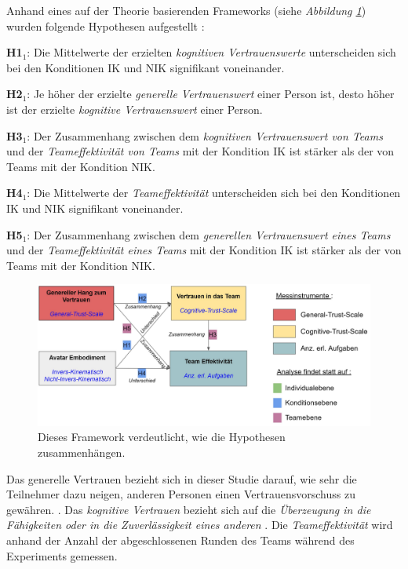\documentclass[sigchi]{acmart}
\begin{document}
Anhand eines auf der Theorie basierenden Frameworks (siehe \textit{Abbildung \ref{Versuchshypothesen}}) wurden folgende Hypothesen aufgestellt :

\textbf{H1$_{1}$}: Die Mittelwerte der erzielten \textit{kognitiven Vertrauenswerte} unterscheiden sich bei den Konditionen IK und NIK signifikant voneinander.

\textbf{H2$_{1}$}: Je höher der erzielte \textit{generelle Vertrauenswert} einer Person ist, desto höher ist der erzielte \textit{kognitive Vertrauenswert} einer Person.

\textbf{H3$_{1}$}: Der Zusammenhang zwischen dem \textit{kognitiven Vertrauenswert von Teams} und der \textit{Teameffektivität von Teams} mit der Kondition IK ist stärker als der von Teams mit der Kondition NIK.

\textbf{H4$_{1}$}: Die Mittelwerte der \textit{Teameffektivität} unterscheiden sich bei den Konditionen IK und NIK signifikant voneinander.

\textbf{H5$_{1}$}: Der Zusammenhang zwischen dem \textit{generellen Vertrauenswert eines Teams} und der \textit{Teameffektivität eines Teams} mit der Kondition IK ist stärker als der von Teams mit der Kondition NIK.

\begin{figure}[H]
		\begin{footnotesize}
			\includegraphics[width=\linewidth]{Abbildungen/Versuchshypothesen_02.JPG}		
			\caption[Das Framework der Versuchshypothesen]{Dieses Framework verdeutlicht, wie die Hypothesen zusammenhängen.}
			\label{Versuchshypothesen}
		\end{footnotesize}
	\end{figure}	

Das generelle Vertrauen bezieht sich in dieser Studie darauf, wie sehr die Teilnehmer dazu neigen, anderen Personen einen Vertrauensvorschuss zu gewähren. \citep[S. 30]{mcallister1995affect}.
Das \textit{kognitive Vertrauen} bezieht sich auf die \textit{Überzeugung in die Fähigkeiten oder in die Zuverlässigkeit eines anderen} \citep[S. 30]{mcallister1995affect}.
Die \textit{Teameffektivität} wird anhand der Anzahl der abgeschlossenen Runden des Teams während des Experiments gemessen.
\end{document}
